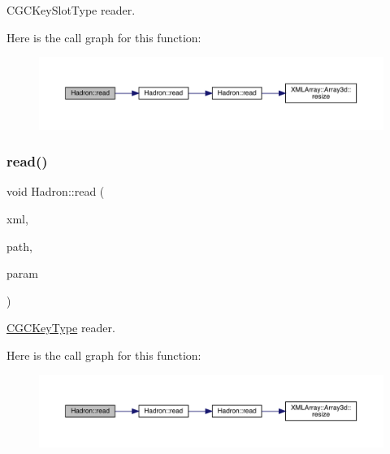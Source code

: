 C\+G\+C\+Key\+Slot\+Type reader. 

Here is the call graph for this function\+:
\nopagebreak
\begin{figure}[H]
\begin{center}
\leavevmode
\includegraphics[width=350pt]{d1/daf/namespaceHadron_a5f60c1536ae1aac0334573f8a80eb687_cgraph}
\end{center}
\end{figure}
\mbox{\label{namespaceHadron_a32f04cfa14604e9b40e037d78c0fad86}} 
\subsubsection{\texorpdfstring{read()}{read()}\hspace{0.1cm}{\footnotesize\ttfamily [4/94]}}
{\footnotesize\ttfamily void Hadron\+::read (\begin{DoxyParamCaption}\item[{\mbox{\hyperlink{classADATXML_1_1XMLReader}{X\+M\+L\+Reader}} \&}]{xml,  }\item[{const std\+::string \&}]{path,  }\item[{\mbox{\hyperlink{structHadron_1_1KeyCGCSU3__t}{Key\+C\+G\+C\+S\+U3\+\_\+t}} \&}]{param }\end{DoxyParamCaption})}



\mbox{\hyperlink{structHadron_1_1CGCKeyType}{C\+G\+C\+Key\+Type}} reader. 

Here is the call graph for this function\+:
\nopagebreak
\begin{figure}[H]
\begin{center}
\leavevmode
\includegraphics[width=350pt]{d1/daf/namespaceHadron_a32f04cfa14604e9b40e037d78c0fad86_cgraph}
\end{center}
\end{figure}
\mbox{\label{namespaceHadron_a2c6adb72eb12fa49cb7c0c7d15aa4aba}} 
